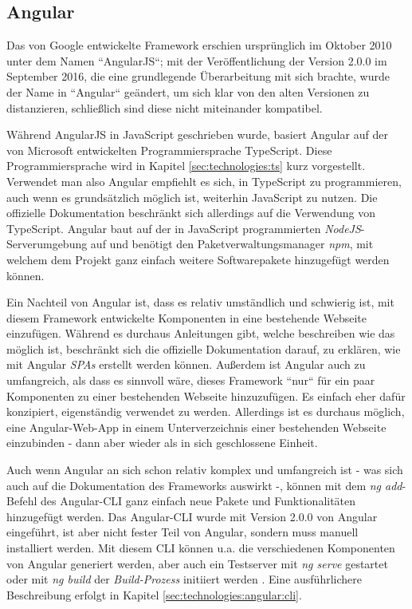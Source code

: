 \subsection{Angular}
\label{sec:technologies:frameworks:angular}
Das von Google entwickelte Framework erschien ursprünglich im Oktober 2010 unter dem Namen ``AngularJS``; mit der Veröffentlichung der Version 2.0.0 im September 2016, die eine grundlegende Überarbeitung mit sich brachte, wurde der Name in ``Angular`` geändert, um sich klar von den alten Versionen zu distanzieren, schließlich sind diese nicht miteinander kompatibel\cite{AngularNaming}.

Während AngularJS in JavaScript geschrieben wurde, basiert Angular auf der von Microsoft entwickelten Programmiersprache TypeScript. Diese Programmiersprache wird in Kapitel \ref{sec:technologies:ts} kurz vorgestellt. Verwendet man also Angular empfiehlt es sich, in TypeScript zu programmieren, auch wenn es grundsätzlich möglich ist, weiterhin JavaScript zu nutzen. Die offizielle Dokumentation beschränkt sich allerdings auf die Verwendung von TypeScript. Angular baut auf der in JavaScript programmierten \textit{NodeJS}-Serverumgebung auf und benötigt den Paketverwaltungsmanager \textit{npm}, mit welchem dem Projekt ganz einfach weitere Softwarepakete hinzugefügt werden können.

Ein Nachteil von Angular ist, dass es relativ umständlich und schwierig ist, mit diesem Framework entwickelte Komponenten in eine bestehende Webseite einzufügen. Während es durchaus Anleitungen gibt, welche beschreiben wie das möglich ist, beschränkt sich die offizielle Dokumentation darauf, zu erklären, wie mit Angular \textit{\acfp{SPA}} erstellt werden können.  Außerdem ist Angular auch zu umfangreich, als dass es sinnvoll wäre, dieses Framework ``nur`` für ein paar Komponenten zu einer bestehenden Webseite hinzuzufügen. Es einfach eher dafür konzipiert, eigenständig verwendet zu werden. Allerdings ist es durchaus möglich, eine Angular-Web-App in einem Unterverzeichnis einer bestehenden Webseite einzubinden - dann aber wieder als in sich geschlossene Einheit.

Auch wenn Angular an sich schon relativ komplex und umfangreich ist - was sich auch auf die Dokumentation des Frameworks auswirkt -, können mit dem \textit{ng add}-Befehl des Angular-\acs{CLI} ganz einfach neue Pakete und Funktionalitäten hinzugefügt werden. Das  Angular-\acs{CLI} wurde mit Version 2.0.0 von Angular eingeführt, ist aber nicht fester Teil von Angular, sondern muss manuell installiert werden. Mit diesem \acl{CLI} können u.a. die verschiedenen Komponenten von Angular generiert werden, aber auch ein Testserver mit \textit{ng serve} gestartet oder mit \textit{ng build} der \textit{Build-Prozess} initiiert werden \cite{AngularCLI}. Eine ausführlichere Beschreibung erfolgt in Kapitel \ref{sec:technologies:angular:cli}.

